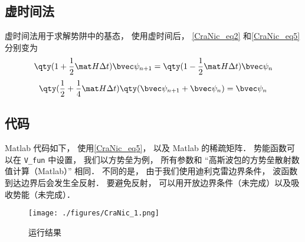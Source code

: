 \subsection{虚时间法}
虚时间法用于求解势阱中的基态， 使用虚时间后， \autoref{CraNic_eq2} 和\autoref{CraNic_eq5} 分别变为
\begin{equation}
\qty(1+\frac12\mat H\Delta t)\bvec\psi_{n+1} = \qty(1-\frac12\mat H\Delta t)\bvec\psi_n
\end{equation}
\begin{equation}
\qty(\frac12 + \frac14\mat H\Delta t)\qty(\bvec\psi_{n+1}+\bvec\psi_n) = \bvec\psi_n
\end{equation}

\subsection{代码}
Matlab 代码如下， 使用\autoref{CraNic_eq5}， 以及 Matlab 的稀疏矩阵． 势能函数可以在 \verb|V_fun| 中设置， 我们以方势垒为例， 所有参数和 “高斯波包的方势垒散射数值计算（Matlab）” 相同． 不同的是， 由于我们使用迪利克雷边界条件， 波函数到达边界后会发生全反射． 要避免反射， 可以用开放边界条件（未完成）以及吸收势能（未完成）．

\begin{figure}[ht]
\centering
\texttt{[image: ./figures/CraNic\_1.png]}
\caption{运行结果} \label{CraNic_fig1}
\end{figure}

